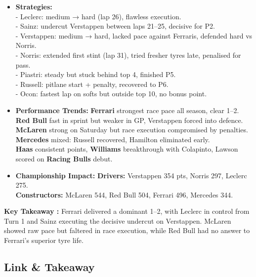\begin{itemize}
    \item \textbf{Strategies:} \\
    - Leclerc: medium → hard (lap 26), flawless execution. \\
    - Sainz: undercut Verstappen between laps 21–25, decisive for P2. \\
    - Verstappen: medium → hard, lacked pace against Ferraris, defended hard vs Norris. \\
    - Norris: extended first stint (lap 31), tried fresher tyres late, penalised for pass. \\
    - Piastri: steady but stuck behind top 4, finished P5. \\
    - Russell: pitlane start + penalty, recovered to P6. \\
    - Ocon: fastest lap on softs but outside top 10, no bonus point.
    
    \item \textbf{Performance Trends:} \textbf{Ferrari} strongest race pace all season, clear 1–2. \\
    \textbf{Red Bull} fast in sprint but weaker in GP, Verstappen forced into defence. \\
    \textbf{McLaren} strong on Saturday but race execution compromised by penalties. \\
    \textbf{Mercedes} mixed: Russell recovered, Hamilton eliminated early. \\
    \textbf{Haas} consistent points, \textbf{Williams} breakthrough with Colapinto, Lawson scored on \textbf{Racing Bulls} debut.
    
    \item \textbf{Championship Impact:} \textbf{Drivers:} Verstappen 354 pts, Norris 297, Leclerc 275. \\
    \textbf{Constructors:} McLaren 544, Red Bull 504, Ferrari 496, Mercedes 344.
\end{itemize}

\textbf{Key Takeaway :} Ferrari delivered a dominant 1–2, with Leclerc in control from Turn 1 and Sainz executing the decisive undercut on Verstappen. McLaren showed raw pace but faltered in race execution, while Red Bull had no answer to Ferrari’s superior tyre life.

\subsection{Link \& Takeaway}

